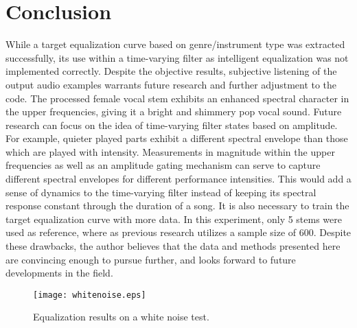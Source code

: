 \documentclass{article}
\begin{document}

\section{Conclusion}
\label{sec:Results}

While a target equalization curve based on genre/instrument type was extracted successfully, its use within a time-varying filter as intelligent equalization was not implemented correctly.  Despite the objective results, subjective listening of the output audio examples warrants future research and further adjustment to the code.  The processed female vocal stem exhibits an enhanced spectral character in the upper frequencies, giving it a bright and shimmery pop vocal sound.  Future research can focus on the idea of time-varying filter states based on amplitude.  For example, quieter played parts exhibit a different spectral envelope than those which are played with intensity.  Measurements in magnitude within the upper frequencies as well as an amplitude gating mechanism can serve to capture different spectral envelopes for different performance intensities.  This would add a sense of dynamics to the time-varying filter instead of keeping its spectral response constant through the duration of a song.  It is also necessary to train the target equalization curve with more data.  In this experiment, only 5 stems were used as reference, where as previous research utilizes a sample size of 600.  Despite these drawbacks, the author believes that the data and methods presented here are convincing enough to pursue further, and looks forward to future developments in the field.

\begin{figure}[htbp]
\centering
\texttt{[image: whitenoise.eps]}
\caption{Equalization results on a white noise test.}
\label{fig:whitenoise}
\end{figure}



\end{document}
